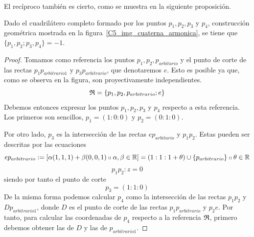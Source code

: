 El recíproco también es cierto, como se muestra en la siguiente proposición.
\begin{prop}
	Dado el cuadrilátero completo formado por los puntos $p_1,p_2,p_3$ y $p_4$, construcción geométrica mostrada en la figura~\ref{C5_img_cuaterna_armonica}, se tiene que $\{p_1,p_2;p_3,p_4\}=-1$.
	
\end{prop}
\begin{proof}
	Tomamos como referencia los puntos $p_1,p_2,p_{arbitario}$ y el punto de corte de las rectas $p_1p_{arbitrario1}$ y $p_3p_{arbitrario}$, que denotaremos $e$. Esto es posible ya que, como se observa en la figura, son proyectivamente independientes.
	\[\mathfrak{R}=\{p_1,p_2,p_{arbitrario};e\}\]
	Debemos entonces expresar los puntos $p_1,p_2,p_3$ y $p_4$ respecto a esta referencia. Los primeros son sencillos, $p_1=(1:0:0)$ y $p_2=(0:1:0)$. 
	
	Por otro lado, $p_3$ es la intersección de las rectas $ep_{arbitario}$ y $p_1p_2$. Estas pueden ser descritas por las ecuaciones
	\begin{equation*}
		ep_{arbitrario}:=\left [ \alpha(1,1,1)+\beta(0,0,1)\shortparallel \alpha,\beta\in \mathbb{R} \right ]=(1:1:1+\theta)\cup\{p_{arbitrario}\}\shortparallel\theta\in\mathbb{R}
	\end{equation*}
	\begin{equation*}
		p_1p_2:z=0
	\end{equation*}
	siendo por tanto el punto de corte 
	\[p_3=(1:1:0)\]
	De la misma forma podemos calcular $p_4$ como la intersección de las rectas $p_1p_2$ y $Dp_{arbitrario1}$, donde $D$ es el punto de corte de las rectas $p_1p_{arbitrario}$ y $p_2e$. Por tanto, para calcular las coordenadas de $p_4$ respecto a la referencia $\mathfrak{R}$, primero debemos obtener las de $D$ y las de $p_{arbitrario1}$.
	

\end{proof}
